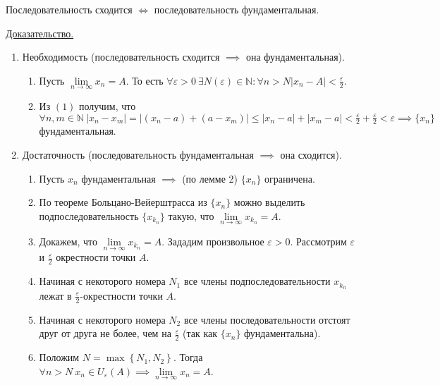 \documentclass{article}
\begin{document}
\begin{theorem}
    \noindent Последовательность сходится \(\iff\) последовательность фундаментальная. 
\end{theorem}
\noindent \underline{Доказательство.}
\begin{enumerate}
    \item Необходимость (последовательность сходится \(\implies\) она фундаментальная).
    \begin{enumerate}
        \item Пусть \(\lim\limits_{n \to \infty} x_n = A\). То есть \(\displaystyle \forall \varepsilon > 0\
        \exists N(\varepsilon) \in \mathbb{N}: \forall n > N \left\vert x_n - A \right\vert < \frac{\varepsilon}{2}\).
        \item Из \({(1)}\) получим, что \(\displaystyle \forall n, m \in \mathbb{N}\ \left\vert x_n  - x_m \right\vert = \left\vert (x_n - a) + (a - x_m) \right\vert \leq \left\vert x_n - a \right\vert + \left\vert x_m  - a \right\vert < \frac{\varepsilon}{2} + \frac{\varepsilon}{2} < \varepsilon \implies \{x_n\}\) фундаментальная.  
    \end{enumerate}
    \item Достаточность (последовательность фундаментальная \(\implies \) она сходится).
    \begin{enumerate}
        \item Пусть \(x_n\) фундаментальная \(\implies\) (по лемме 2) \(\{x_n\}\) ограничена.
        \item По теореме Больцано-Вейерштрасса из \(\{x_n\}\) можно выделить подпоследовательность \(\{x_{k_n}\}\) такую, что \( \lim\limits_{n \to \infty} x_{k_n} = A\).
        \item Докажем, что \( \lim\limits_{n \to \infty} x_{k_n} = A\). Зададим произвольное \(\varepsilon > 0\). Рассмотрим \(\varepsilon\) и \(\displaystyle \frac{\varepsilon}{2}\) окрестности точки \(A\).
        \item Начиная с некоторого номера \(N_1\) все члены подпоследовательности \(x_{k_n}\) лежат в \(\displaystyle \frac{\varepsilon}{2}\)-окрестности точки \(A\).
        \item Начиная с некоторого номера \(N_2\) все члены последовательности отстоят друг от друга не более, чем на \(\displaystyle \frac{\varepsilon}{2}\) (так как \(\{x_n\}\) фундаментальна).
        \item Положим \(N = \max\left\{N_1, N_2\right\}\). Тогда \(\forall n > N\ x_n \in U_{\varepsilon}(A) \implies \lim\limits_{n \to \infty} x_n = A\).  
    \end{enumerate}
\end{enumerate}
\end{document}

